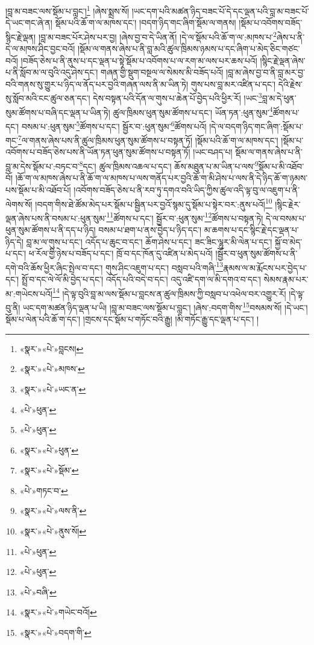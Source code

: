 །བླ་མ་བཟང་ལས་སྡོམ་པ་བླང་།\footnote{«སྣར་»«པེ་»བླངས།} །ཞེས་སྨྲས་སོ། །ཡང་དག་པའི་མཚན་ཉིད་བཟང་པོ་དེ་དང་ལྡན་པའི་བླ་མ་བཟང་པོ་དེ་ཡང་གང་ཞེ་ན། སྡོམ་པའི་ཆོ་ག་ལ་མཁས་དང་། །བདག་ཉིད་གང་ཞིག་སྡོམ་ལ་གནས། །སྡོམ་པ་འབོགས་བཟོད་སྙིང་རྗེ་ལྡན། །བླ་མ་བཟང་པོར་ཤེས་པར་བྱ། །ཞེས་བྱ་བ་དེ་ཡིན་ནོ། །དེ་ལ་སྡོམ་པའི་ཆོ་ག་ལ་:མཁས་པ་\footnote{«སྣར་»«པེ་»མཁས་}ཞེས་པ་ནི་དེ་ལ་མཁས་ཤིང་བྱང་བའོ། །སྡོམ་ལ་གནས་ཞེས་པ་ནི་བླ་མའི་ཚུལ་ཁྲིམས་ཉམས་པ་དང་ཞིག་པ་མེད་ཅིང་གཙང་བའོ། །བཟོད་ཅེས་པ་ནི་ནུས་པ་དང་ལྡན་པ་སྟེ་སྡོམ་པ་འབོགས་པ་ལ་རག་མ་ལས་པར་ཆས་པའོ། །སྙིང་རྗེ་ལྡན་ཞེས་པ་ནི་སློབ་མ་ལ་བུའི་འདུ་ཤེས་དང་། གཞན་གྱི་སྡུག་བསྔལ་ལ་སེམས་མི་བཟོད་པའོ། །བླ་མ་ཞེས་བྱ་བ་ནི་བླ་མར་བྱ་བའི་གནས་སུ་གྱུར་པ་ཉིད་ལ་ནོད་པར་བྱའི་གཞན་ལས་ནི་མ་ཡིན་ཏེ། གུས་པས་བླ་མར་འཛིན་པ་དང་། དེའི་རྗེས་སུ་སློབ་མའི་ངང་ཚུལ་ཅན་དང་། དེས་བསྟན་པའི་དོན་ལ་གུས་པ་ཆེན་པོ་བྱེད་པའི་ཕྱིར་རོ། །ཡང་\footnote{«སྣར་»«པེ་»ཡང་ན་}བླ་མ་དེ་ཕུན་སུམ་ཚོགས་པ་བཞི་དང་ལྡན་པ་ཡིན་ཏེ། ཚུལ་ཁྲིམས་ཕུན་སུམ་ཚོགས་པ་དང་། ཡོན་ཏན་:ཕུན་སུམ་\footnote{«པེ་»ཕུན་}ཚོགས་པ་དང་། བསམ་པ་:ཕུན་སུམ་\footnote{«པེ་»ཕུན་}ཚོགས་པ་དང་། སྦྱོར་བ་:ཕུན་སུམ་\footnote{«སྣར་»«པེ་»ཕུན་}ཚོགས་པའོ། །དེ་ལ་བདག་ཉིད་གང་ཞིག་:སྡོམ་པ་གང་\footnote{«སྣར་»«པེ་»སྡོམ་}ལ་གནས་ཞེས་པས་ནི་ཚུལ་ཁྲིམས་ཕུན་སུམ་ཚོགས་པ་བསྟན་ཏོ། །སྡོམ་པའི་ཆོ་ག་ལ་མཁས་དང་། །སྡོམ་པ་འབོགས་པ་བཟོད་ཅེས་པས་ནི་ཡོན་ཏན་ཕུན་སུམ་ཚོགས་པ་བསྟན་ཏོ། །ཡང་བཤད་པ། སྡོམ་ལ་གནས་ཞེས་པ་ནི་བླ་མ་དེས་སྡོམ་པ་:བཏང་བ་\footnote{«པེ་»གཏང་བ་}དང་། ཚུལ་ཁྲིམས་འཆལ་པ་དང་། ཆོས་མཐུན་པ་མ་ཡིན་པ་ལས་\footnote{«སྣར་»«པེ་»ལས་ནི་}སྡོམ་པ་མི་འཐོབ་བོ། །ཆོ་ག་ལ་མཁས་ཞེས་པ་ནི་ཆོ་ག་ལ་མཁས་པ་ལས་གནོད་པར་བྱའི་ཆོ་ག་མི་ཤེས་པ་ལས་ནི་དེ་ཉིད་ཆོ་ག་ཉམས་པས་སྡོམ་པ་མི་འཐོབ་པོ། །འབོགས་བཟོད་ཅེས་པ་ནི་རབ་ཏུ་དགའ་བའི་ཡིད་ཀྱིས་ཚུལ་འདི་ལྟ་བུ་ལ་འཇུག་པ་ནི་ལེགས་སོ། །བདག་གིས་ཐེ་ཚོམ་མེད་པར་སྡོམ་པ་སྦྱིན་པར་བྱའོ་སྙམ་དུ་སྡོམ་པ་སྟེར་བར་:ནུས་པའོ།\footnote{«སྣར་»«པེ་»ནུས་སོ།} །སྙིང་རྗེར་ལྡན་ཞེས་པས་ནི་བསམ་པ་:ཕུན་སུམ་\footnote{«པེ་»ཕུན་}ཚོགས་པ་དང་། སྦྱོར་བ་:ཕུན་སུམ་\footnote{«པེ་»ཕུན་}ཚོགས་པ་བསྟན་ཏེ། དེ་ལ་བསམ་པ་ཕུན་སུམ་ཚོགས་པ་ནི་དད་པ་ཉིད། བསམ་པ་ཐག་པ་ནས་བྱེད་པ་ཉིད་དང་། མ་ཆགས་པ་དང་སྙིང་རྗེ་དང་ལྡན་པ་ཉིད་དེ། བླ་མ་ལ་གུས་པ་དང་། འདོད་པ་ཆུང་བ་དང་། ཆོག་ཤེས་པ་དང་། ཟང་ཟིང་ལྷུར་མི་ལེན་པ་དང་། སྐྱོ་བ་མེད་པ་དང་། ཕ་རོལ་གྱི་ཉེས་པ་བཟོད་པ་དང་། ཁྲོ་བ་དང་ཁོན་དུ་འཛིན་པ་མེད་པའོ། །སྦྱོར་བ་ཕུན་སུམ་ཚོགས་པ་ནི་དགེ་བའི་ཆོས་ཕྱིར་ཞིང་སྤེལ་བ་དང་། གུས་ཤིང་འཇུག་པ་དང་། བསླབ་པའི་གཞི་\footnote{«པེ་»བཞི་}རྣམས་ལ་མ་རྨོངས་པར་བྱེད་པ་དང་། སྤྲོ་བ་དང་ལེ་ལོ་མི་བྱེད་པ་དང་། འདོད་པའི་བདེ་བ་དང་། འདུ་འཛི་དག་ལ་མི་དགའ་བ་དང་། སེམས་རྣམ་པར་མ་:གཡེངས་པའོ།\footnote{«སྣར་»«པེ་»གཡེང་བའོ།} །དེ་ལྟ་བུའི་བླ་མ་ལས་སྡོམ་པ་བླངས་ན་ཚུལ་ཁྲིམས་ཀྱི་བསླབ་པ་འཕེལ་བར་འགྱུར་རོ། །དེ་ལྟ་བུ་ནི། ཡང་དག་མཚན་ཉིད་ལྡན་པ་ཡི། །བླ་མ་བཟང་ལས་སྡོམ་པ་བླང་། །ཞེས་:བདག་གིས་\footnote{«སྣར་»«པེ་»བདག་གི་}བསམས་སོ། །དེ་ཡང་། སྡོམ་པ་ལེན་པའི་ཆོ་ག་དང་། །གྲངས་དང་སྡོམ་པ་གཏོང་བའི་རྒྱུ། །མི་གཏོང་རྒྱུ་དང་ལྡན་པ་དང་། །
